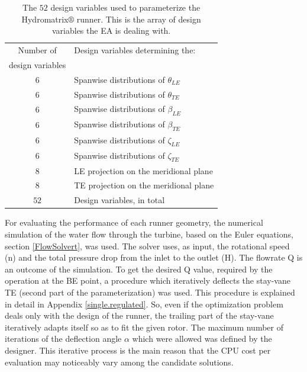 \begin{table}[h!]
\begin{center}
\begin{tabular}{ |c|l| }
\hline

Number of              & Design variables determining the:\\
design variables       & \\
\hline
6 & Spanwise distributions of $\theta_{LE}$\\
\hline
6 & Spanwise distributions of $\theta_{TE}$\\
\hline
6 & Spanwise distributions of $\beta_{LE}$\\
\hline
6 & Spanwise distributions of $\beta_{TE}$\\
\hline
6 & Spanwise distributions of $\zeta_{LE}$\\
\hline
6 & Spanwise distributions of $\zeta_{TE}$\\
\hline
8 & LE projection on the meridional plane\\
\hline
8 & TE projection on the meridional plane\\
\hline
\hline
$52$ & Design variables, in total \\
\hline   
\end{tabular}
\caption{
The $52$ design variables used to parameterize the Hydromatrix$\circledR$ runner. This is the array of design variables the EA is dealing with.}
\label{design_vars2}
\end{center}
\end{table}

For evaluating the performance of each runner geometry, the numerical simulation of the water flow through the turbine, based on the Euler equations, section \ref{FlowSolvert}, was used. The solver uses, as input, the rotational speed (n) and the total pressure drop from  the inlet to the outlet (H). The flowrate Q is an outcome of the simulation. To get the desired Q value, required by the operation at the BE point, a procedure which iteratively deflects the stay-vane TE (second part of the parameterization) was used. This procedure is explained in detail in Appendix \ref{single.regulated}. So, even if the optimization problem deals only with the design of the runner, the trailing part of the stay-vane iteratively adapts itself so as to fit the given rotor. The maximum number of iterations of the deflection angle $\alpha$ which were allowed was defined by the designer. This iterative process is the main reason that the CPU cost per evaluation may noticeably vary among the candidate solutions.



